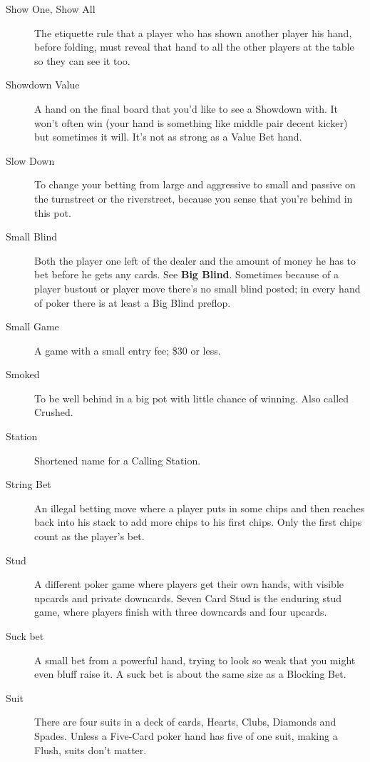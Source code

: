 \begin{description}
\item[Show One, Show All] The etiquette rule that a player who has
shown another player his hand, before folding, must reveal that hand
to all the other players at the table so they can see it too.

\item[Showdown Value] A hand on the final board that you'd like to see
a Showdown with. It won't often win (your hand is something like
middle pair decent kicker) but sometimes it will. It's not as strong
as a Value Bet hand.

\item[Slow Down] To change your betting from large and aggressive
to small and passive on the turnstreet or the riverstreet, because
you sense that you're behind in this pot.

\item[Small Blind] Both the player one left of the dealer and the
amount of money he has to bet before he gets any cards. See
\textbf{Big Blind}. Sometimes because of a player bustout or player
move there's no small blind posted; in every hand of poker there is at
least a Big Blind preflop.

\item[Small Game] A game with a small entry fee; \$30 or less.

\item[Smoked] To be well behind in a big pot with little chance of
winning. Also called Crushed.

\item[Station] Shortened name for a Calling Station.

\item[String Bet] An illegal betting move where a player puts in some
chips and then reaches back into his stack to add more chips to his
first chips. Only the first chips count as the player's bet.

\item[Stud] A different poker game where players get their own hands,
with visible upcards and private downcards. Seven Card Stud is the
enduring stud game, where players finish with three downcards and four
upcards.

\item[Suck bet] A small bet from a powerful hand, trying to look so
weak that you might even bluff raise it. A suck bet is about the same
size as a Blocking Bet.

\item[Suit] There are four suits in a deck of cards, Hearts, Clubs,
Diamonds and Spades. Unless a Five-Card poker hand has five of one
suit, making a Flush, suits don't matter.


\end{description}
